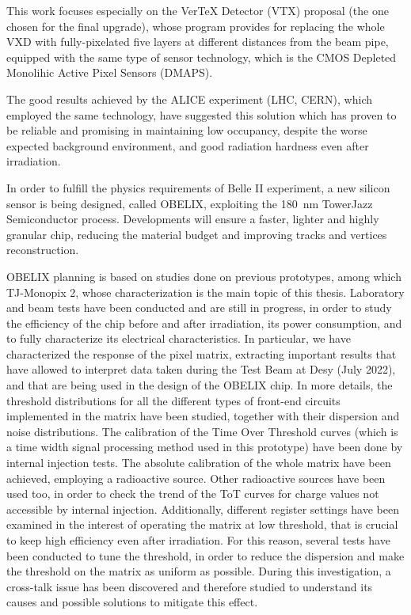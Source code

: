 \documentclass[10pt,a4paper]{report}
\begin{document}
This work focuses especially on the VerTeX Detector (VTX) proposal (the one chosen for the final upgrade), whose program provides for replacing the whole VXD with fully-pixelated five layers at different distances from the beam pipe, equipped with the same type of sensor technology, which is the CMOS Depleted Monolihic Active Pixel Sensors (DMAPS). 

The good results achieved by the ALICE experiment (LHC, CERN), which employed the same technology, have suggested this solution which has proven to be reliable and promising in maintaining low occupancy, despite the worse expected background environment, and good radiation hardness even after irradiation. 

In order to fulfill the physics requirements of Belle II experiment, a new silicon sensor is being designed, called OBELIX, exploiting the \SI{180}{nm} TowerJazz Semiconductor process. Developments will ensure a faster, lighter and highly granular chip, reducing the material budget and improving tracks and vertices reconstruction. 

OBELIX planning is based on studies done on previous prototypes, among which TJ-Monopix 2, whose characterization is the main topic of this thesis. Laboratory and beam tests have been conducted and are still in progress, in order to study the efficiency of the chip before and after irradiation, its power consumption, and to fully characterize its electrical characteristics. 
In particular, we have characterized the response of the pixel matrix, extracting important results that have allowed to interpret data taken during the Test Beam at Desy (July 2022), and that are being used in the design of the OBELIX chip. 
In more details, the threshold distributions for all the different types of front-end circuits implemented in the matrix have been studied, together with their dispersion and noise distributions. 
The calibration of the Time Over Threshold curves (which is a time width signal processing method used in this prototype) have been done by internal injection tests. The absolute calibration of the whole matrix have been achieved, employing a  radioactive source. Other radioactive sources have been used too, in order to check the trend of the ToT curves for charge values not accessible by internal injection. 
Additionally, different register settings have been examined in the interest of operating the matrix at low threshold, that is crucial to keep high efficiency even after irradiation. For this reason, several tests have been conducted to tune the threshold, in order to reduce the dispersion and make the threshold on the matrix as uniform as possible.
During this investigation, a cross-talk issue has been discovered and therefore studied to understand its causes and possible solutions to mitigate this effect.
\end{document}
